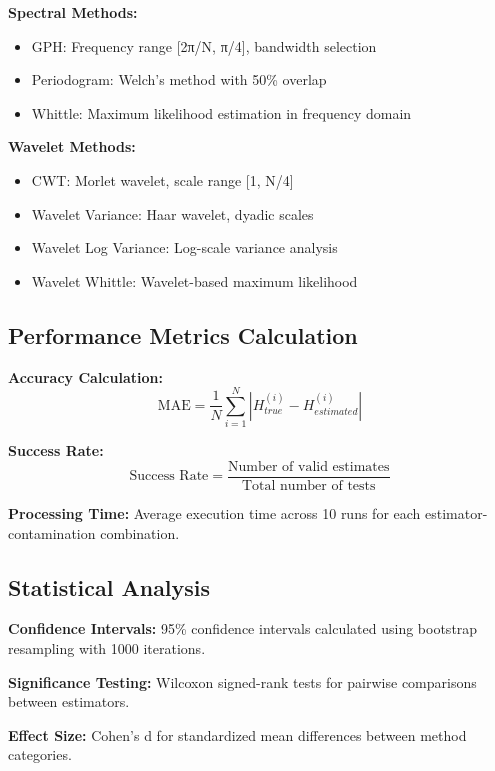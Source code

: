 \textbf{Spectral Methods:}
\begin{itemize}
    \item GPH: Frequency range [2π/N, π/4], bandwidth selection
    \item Periodogram: Welch's method with 50\% overlap
    \item Whittle: Maximum likelihood estimation in frequency domain
\end{itemize}

\textbf{Wavelet Methods:}
\begin{itemize}
    \item CWT: Morlet wavelet, scale range [1, N/4]
    \item Wavelet Variance: Haar wavelet, dyadic scales
    \item Wavelet Log Variance: Log-scale variance analysis
    \item Wavelet Whittle: Wavelet-based maximum likelihood
\end{itemize}

\subsection{Performance Metrics Calculation}

\textbf{Accuracy Calculation:}
\begin{equation}
\text{MAE} = \frac{1}{N} \sum_{i=1}^{N} |H_{true}^{(i)} - H_{estimated}^{(i)}|
\end{equation}

\textbf{Success Rate:}
\begin{equation}
\text{Success Rate} = \frac{\text{Number of valid estimates}}{\text{Total number of tests}}
\end{equation}

\textbf{Processing Time:}
Average execution time across 10 runs for each estimator-contamination combination.

\subsection{Statistical Analysis}

\textbf{Confidence Intervals:}
95\% confidence intervals calculated using bootstrap resampling with 1000 iterations.

\textbf{Significance Testing:}
Wilcoxon signed-rank tests for pairwise comparisons between estimators.

\textbf{Effect Size:}
Cohen's d for standardized mean differences between method categories.

